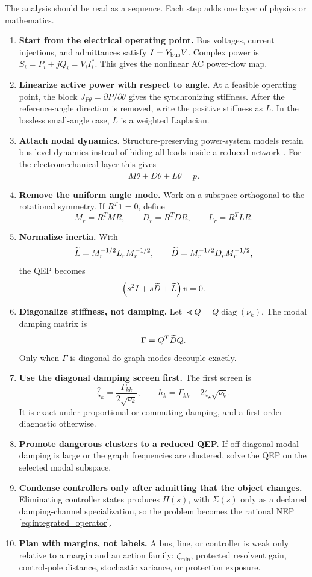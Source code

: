 The analysis should be read as a sequence. Each step adds one layer of physics
or mathematics.

\begin{enumerate}
\item \textbf{Start from the electrical operating point.} Bus voltages,
current injections, and admittances satisfy \(I=Y_{\rm bus}V\). Complex power
is \(S_i=P_i+jQ_i=V_iI_i^*\). This gives the nonlinear AC power-flow map.
\item \textbf{Linearize active power with respect to angle.} At a feasible
operating point, the block \(J_{P\theta}=\partial P/\partial\theta\) gives the
synchronizing stiffness. After the reference-angle direction is removed, write
the positive stiffness as \(L\). In the lossless small-angle case, \(L\) is a
weighted Laplacian.
\item \textbf{Attach nodal dynamics.} Structure-preserving power-system models
retain bus-level dynamics instead of hiding all loads inside a reduced network
\cite{bergen1981structure,kundur1994power,sauer2017power,milano2010power}.
For the electromechanical layer this gives
\[
  M\ddot\theta+D\dot\theta+L\theta=p.
\]
\item \textbf{Remove the uniform angle mode.} Work on a subspace orthogonal to
the rotational symmetry. If \(R^T\mathbf 1=0\), define
\[
  M_r=R^TMR,\qquad D_r=R^TDR,\qquad L_r=R^TLR.
\]
\item \textbf{Normalize inertia.} With
\[
  \widetilde L=M_r^{-1/2}L_rM_r^{-1/2},\qquad
  \widetilde D=M_r^{-1/2}D_rM_r^{-1/2},
\]
the QEP becomes
\[
  \left(s^2I+s\widetilde D+\widetilde L\right)v=0.
\]
\item \textbf{Diagonalize stiffness, not damping.} Let
\(\Lt Q=Q\operatorname{diag}(\nu_k)\). The modal damping matrix is
\[
  \Gamma=Q^T\widetilde D Q.
\]
Only when \(\Gamma\) is diagonal do graph modes decouple exactly.
\item \textbf{Use the diagonal damping screen first.} The first screen is
\[
  \hat\zeta_k=\frac{\Gamma_{kk}}{2\sqrt{\nu_k}},
  \qquad
  h_k=\Gamma_{kk}-2\zeta_\star\sqrt{\nu_k}.
\]
It is exact under proportional or commuting damping, and a first-order
diagnostic otherwise.
\item \textbf{Promote dangerous clusters to a reduced QEP.} If off-diagonal
modal damping is large or the graph frequencies are clustered, solve the QEP
on the selected modal subspace.
\item \textbf{Condense controllers only after admitting that the object
changes.} Eliminating controller states produces \(\Pi(s)\), with
\(\Sigma(s)\) only as a declared damping-channel specialization, so the problem
becomes the rational NEP \eqref{eq:integrated_operator}.
\item \textbf{Plan with margins, not labels.} A bus, line, or controller is
weak only relative to a margin and an action family: \(\zeta_{\min}\), protected
resolvent gain, control-pole distance, stochastic variance, or protection
exposure.
\end{enumerate}

